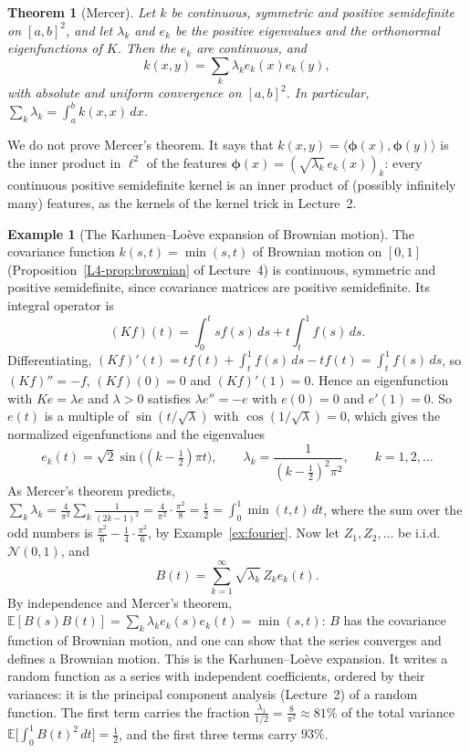 \documentclass[11pt]{article}
\newcommand{\ip}[2]{\langle #1, #2 \rangle}
\newcommand{\E}{\mathbb{E}}
\theoremstyle{definition}
\newtheorem{example}[definition]{Example}
\theoremstyle{plain}
\newtheorem{theorem}[definition]{Theorem}
\theoremstyle{remark}
\begin{document}
\begin{theorem}[Mercer]\label{thm:mercer}
    Let $k$ be continuous, symmetric and positive semidefinite on $[a, b]^2$, and let $\lambda_k$ and $e_k$ be the positive eigenvalues and the orthonormal eigenfunctions of $K$. Then the $e_k$ are continuous, and
    \[k(x, y) = \sum_k \lambda_ke_k(x)e_k(y),\]
    with absolute and uniform convergence on $[a, b]^2$. In particular, $\sum_k \lambda_k = \int_a^b k(x, x)\, dx$.
\end{theorem}

We do not prove Mercer's theorem. It says that $k(x, y) = \ip{\boldsymbol{\phi}(x)}{\boldsymbol{\phi}(y)}$ is the inner product in $\ell^2$ of the features $\boldsymbol{\phi}(x) = (\sqrt{\lambda_k}\,e_k(x))_k$: every continuous positive semidefinite kernel is an inner product of (possibly infinitely many) features, as the kernels of the kernel trick in Lecture~2.

\begin{example}[The Karhunen--Lo\`eve expansion of Brownian motion]\label{ex:karhunen-loeve}
    The covariance function $k(s, t) = \min(s, t)$ of Brownian motion on $[0, 1]$ (Proposition~\ref{L4-prop:brownian} of Lecture~4) is continuous, symmetric and positive semidefinite, since covariance matrices are positive semidefinite. Its integral operator is
    \[(Kf)(t) = \int_0^t sf(s)\, ds + t\int_t^1 f(s)\, ds.\]
    Differentiating, $(Kf)'(t) = tf(t) + \int_t^1 f(s)\, ds - tf(t) = \int_t^1 f(s)\, ds$, so $(Kf)'' = -f$, $(Kf)(0) = 0$ and $(Kf)'(1) = 0$. Hence an eigenfunction with $Ke = \lambda e$ and $\lambda > 0$ satisfies $\lambda e'' = -e$ with $e(0) = 0$ and $e'(1) = 0$. So $e(t)$ is a multiple of $\sin(t/\sqrt{\lambda})$ with $\cos(1/\sqrt{\lambda}) = 0$, which gives the normalized eigenfunctions and the eigenvalues
    \[e_k(t) = \sqrt{2}\sin\big((k - \tfrac{1}{2})\pi t\big), \qquad \lambda_k = \frac{1}{(k - \frac{1}{2})^2\pi^2}, \qquad k = 1, 2, \ldots\]
    As Mercer's theorem predicts, $\sum_k \lambda_k = \frac{4}{\pi^2}\sum_k \frac{1}{(2k - 1)^2} = \frac{4}{\pi^2} \cdot \frac{\pi^2}{8} = \frac{1}{2} = \int_0^1 \min(t, t)\, dt$, where the sum over the odd numbers is $\frac{\pi^2}{6} - \frac{1}{4} \cdot \frac{\pi^2}{6}$, by Example~\ref{ex:fourier}. Now let $Z_1, Z_2, \ldots$ be i.i.d.\ $\mathcal{N}(0, 1)$, and
    \[B(t) = \sum_{k=1}^\infty \sqrt{\lambda_k}\,Z_ke_k(t).\]
    By independence and Mercer's theorem, $\E[B(s)B(t)] = \sum_k \lambda_ke_k(s)e_k(t) = \min(s, t)$: $B$ has the covariance function of Brownian motion, and one can show that the series converges and defines a Brownian motion. This is the Karhunen--Lo\`eve expansion. It writes a random function as a series with independent coefficients, ordered by their variances: it is the principal component analysis (Lecture~2) of a random function. The first term carries the fraction $\frac{\lambda_1}{1/2} = \frac{8}{\pi^2} \approx 81\%$ of the total variance $\E\big[\int_0^1 B(t)^2\, dt\big] = \frac{1}{2}$, and the first three terms carry $93\%$.
\end{example}
\end{document}
